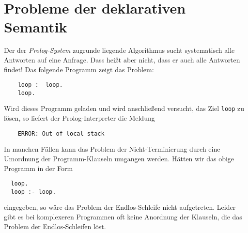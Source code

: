 \section{Probleme der deklarativen Semantik}
Der der \textsl{Prolog-System} zugrunde liegende Algorithmus sucht systematisch alle
Antworten auf eine Anfrage.  Dass heißt aber nicht,
dass er auch alle Antworten  findet!   Das folgende Programm zeigt das Problem:
\begin{verbatim}
    loop :- loop.
    loop.
\end{verbatim}
Wird dieses Programm geladen und wird anschließend versucht, das Ziel \texttt{loop} zu
lösen, so liefert der Prolog-Interpreter die Meldung
\begin{verbatim}
    ERROR: Out of local stack
\end{verbatim}

In manchen Fällen kann  das Problem der Nicht-Terminierung 
 durch eine Umordnung der Programm-Klauseln umgangen werden.
Hätten wir das obige Programm in  der Form
\begin{verbatim}
  loop.
  loop :- loop.
\end{verbatim}
eingegeben, so wäre das Problem der Endlos-Schleife nicht aufgetreten.  Leider gibt es bei
komplexeren Programmen oft keine Anordnung der Klauseln, die das Problem der
Endlos-Schleifen löst.  


